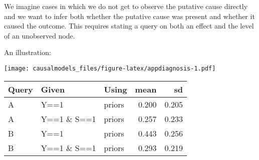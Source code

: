 \documentclass[
  12pt,
]{book}
\newenvironment{Shaded}{\begin{snugshade}}{\end{snugshade}}
\newcommand{\DataTypeTok}[1]{\textcolor[rgb]{0.13,0.29,0.53}{#1}}
\newcommand{\KeywordTok}[1]{\textcolor[rgb]{0.13,0.29,0.53}{\textbf{#1}}}
\newcommand{\NormalTok}[1]{#1}
\newcommand{\OperatorTok}[1]{\textcolor[rgb]{0.81,0.36,0.00}{\textbf{#1}}}
\newcommand{\OtherTok}[1]{\textcolor[rgb]{0.56,0.35,0.01}{#1}}
\newcommand{\StringTok}[1]{\textcolor[rgb]{0.31,0.60,0.02}{#1}}
\begin{document}
We imagine cases in which we do not get to observe the putative cause directly and we want to infer both whether the putative cause was present and whether it caused the outcome. This requires stating a query on both an effect and the level of an unobserved node.

An illustration:

\begin{Shaded}
\end{Shaded}

\texttt{[image: causalmodels\_files/figure-latex/appdiagnosis-1.pdf]}

\begin{Shaded}
\end{Shaded}

\begin{tabular}{l|l|l|r|r}
\hline
Query & Given & Using & mean & sd\\
\hline
A & Y==1 & priors & 0.200 & 0.205\\
\hline
A & Y==1 \& S==1 & priors & 0.257 & 0.233\\
\hline
B & Y==1 & priors & 0.443 & 0.256\\
\hline
B & Y==1 \& S==1 & priors & 0.293 & 0.219\\
\hline
\end{tabular}
\end{document}
